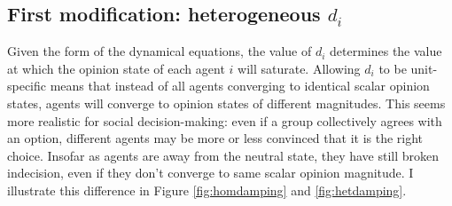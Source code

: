 \documentclass[]{article}
\begin{document}
\subsection{First modification: heterogeneous $d_i$}

Given the form of the dynamical equations, the value of $d_i$ determines the value at which the opinion state of each agent $i$ will saturate. Allowing $d_i$ to be unit-specific means that instead of all agents converging to identical scalar opinion states, agents will converge to opinion states of different magnitudes. This seems more realistic for social decision-making: even if a group collectively agrees with an option, different agents may be more or less convinced that it is the right choice. Insofar as agents are away from the neutral state, they have still broken indecision, even if they don't converge to same scalar opinion magnitude. I illustrate this difference in Figure \ref{fig:homdamping} and \ref{fig:hetdamping}.
\end{document}
